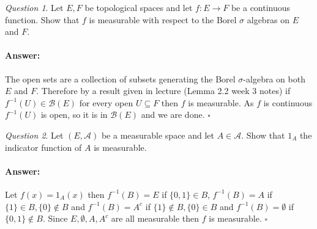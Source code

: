 \documentclass[11pt]{article}
\theoremstyle{definition}
\theoremstyle{remark}
\newtheorem{q}{Question}
\newenvironment{ans}{\paragraph{Answer:}}{\hfill$\square$}
\begin{document}
\begin{q}
Let $E,F$ be topological spaces and let $f: E \rightarrow F$ be a continuous function. Show that $f$ is measurable with respect to the Borel $\sigma$ algebras on $E$ and $F$.
\end{q}
\begin{ans}
The open sets are a collection of subsets generating the Borel $\sigma$-algebra on both $E$ and $F$. Therefore by a result given in lecture (Lemma 2.2 week 3 notes) if $f^{-1}(U) \in \mathcal{B}(E)$ for every open $U \subseteq F$ then $f$ is measurable. As $f$ is continuous $f^{-1}(U)$ is open, so it is in $\mathcal{B}(E)$ and we are done.
\end{ans}

\begin{q}
Let $(E, \mathcal{A})$ be a measurable space and let $A \in \mathcal{A}$. Show that $1_A$ the indicator function of $A$ is measurable. 
\end{q}
\begin{ans}
Let $f(x) = 1_{A}(x)$ then $f^{-1}(B) = E$ if $\{0,1\} \in B$, $f^{-1}(B) = A$ if $\{1\} \in B, \{0\} \notin B$ and $f^{-1}(B) = A^c$ if $\{1\} \notin B, \{0\} \in B$ and $f^{-1}(B) = \emptyset$ if $\{0,1\} \notin B$. Since $E, \emptyset, A, A^c$ are all measurable then $f$ is measurable.
\end{ans}
\end{document}
